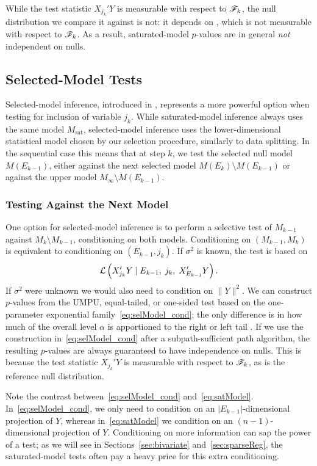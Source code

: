 \documentclass{article}
\begin{document}
While the test statistic $X_{j_k}'Y$ is measurable with respect to $\mathscr{F}_k$, the null distribution we compare it against is not: it depends on , which is not measurable with respect to $\mathscr{F}_k$. As a result, saturated-model $p$-values are in general {\em not} independent on nulls.

\subsection{Selected-Model Tests}
Selected-model inference, introduced in \citet{fithian2014optimal},
represents a more powerful option when testing for inclusion of variable $j_k$. While saturated-model inference always uses the same model $M_{\text{sat}}$, selected-model inference uses the lower-dimensional statistical model chosen by our selection procedure, similarly to data splitting. In the sequential case this means that at step $k$, we test the selected null model $M(E_{k-1})$, either against the next selected model $M(E_k)\setminus M(E_{k-1})$ or against the upper model $M_\infty\setminus M(E_{k-1})$.

\subsubsection{Testing Against the Next Model}\label{sec:identify}
One option for selected-model inference is to perform a selective test of $M_{k-1}$ against $M_{k}\setminus M_{k-1}$, conditioning on both models. Conditioning on $(M_{k-1},M_k)$ is equivalent to conditioning on $(E_{k-1}, j_k)$. If $\sigma^2$ is known, the test is based on
\begin{equation}\label{eq:selModel_cond}
\mathcal{L}\left(X_{j_k}'Y \mid E_{k-1}, \; j_k, \; X_{E_{k-1}}'Y\right).
\end{equation}
If $\sigma^2$ were unknown we would also need to condition on $\|Y\|^2$. We can construct $p$-values from the UMPU, equal-tailed, or one-sided test based on the one-parameter exponential family~\eqref{eq:selModel_cond}; the only difference is in how much of the overall level $\alpha$ is apportioned to the right or left tail \citep{fithian2014optimal}. If we use the construction in~\eqref{eq:selModel_cond} after a subpath-sufficient path algorithm, the resulting $p$-values are always guaranteed to have independence on nulls. This is because the test statistic $X_{j_k}'Y$ is measurable with respect to $\mathscr{F}_k$, as is the reference null distribution.

Note the contrast between~\eqref{eq:selModel_cond} and~\eqref{eq:satModel}. In~\eqref{eq:selModel_cond}, we only need to condition on an $|E_{k-1}|$-dimensional projection of $Y$, whereas in~\eqref{eq:satModel} we condition on an $(n-1)$-dimensional projection of $Y$. Conditioning on more information can sap the power of a test; as we will see in Sections~\ref{sec:bivariate} and~\ref{sec:sparseReg}, the saturated-model tests often pay a heavy price for this extra conditioning.
\end{document}
